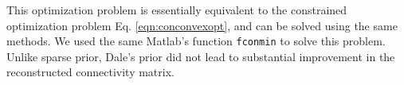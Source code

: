 This optimization problem is essentially equivalent to the constrained optimization problem Eq. \eqref{eqn:conconvexopt}, and can be solved using the same methods. We used the same Matlab's function \texttt{fconmin} to solve this problem. Unlike sparse prior, Dale's prior did not lead to substantial improvement in the reconstructed connectivity matrix.
